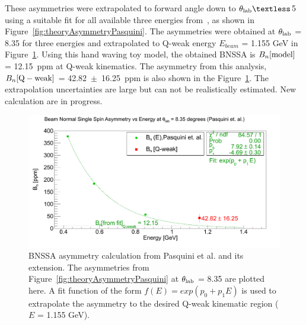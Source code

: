 These asymmetries were extrapolated to forward angle down to $\theta_{\rm lab}\textless$5\degrees{} using a suitable fit for all available three energies from~\cite{presentation:pasquini_Mainz}, as shown in Figure~\ref{fig:theoryAsymmetryPasquini}. The asymmetries were obtained at $\theta_{\rm lab}$ = 8.35\degrees{} for three energies and extrapolated to Q-weak energy $E_{beam}$ = 1.155 GeV in Figure~\ref{fig:theoryAsymmetryPasquiniEnergyDependence}. Using this hand waving toy model, the obtained BNSSA is $B_{n}[{\rm model}]$ = 12.15~ppm at Q-weak kinematics. The asymmetry from this analysis, $B_{n}[{\rm Q-weak}]$ = 42.82~$\pm$~16.25~ppm is also shown in the Figure~\ref{fig:theoryAsymmetryPasquiniEnergyDependence}. The extrapolation uncertainties are large but can not be realistically estimated. New calculation are in progress. 

\begin{figure}[!h]
	\begin{center}
	\includegraphics[width=15.0cm]{figures/theoryAsymmetryPasquiniEnergyDependence}
	\end{center}
	\caption
	{BNSSA asymmetry calculation from Pasquini et al. and its extension. The asymmetries from Figure~\ref{fig:theoryAsymmetryPasquini} at $\theta_{\rm lab}$ = 8.35\degrees{} are plotted here. A fit function of the form $f(E) = exp(p_{0}+p_{1}E)$ is used to extrapolate the asymmetry to the desired Q-weak kinematic region ($E$ = 1.155 GeV).}
	\label{fig:theoryAsymmetryPasquiniEnergyDependence}
\end{figure}


%
%

